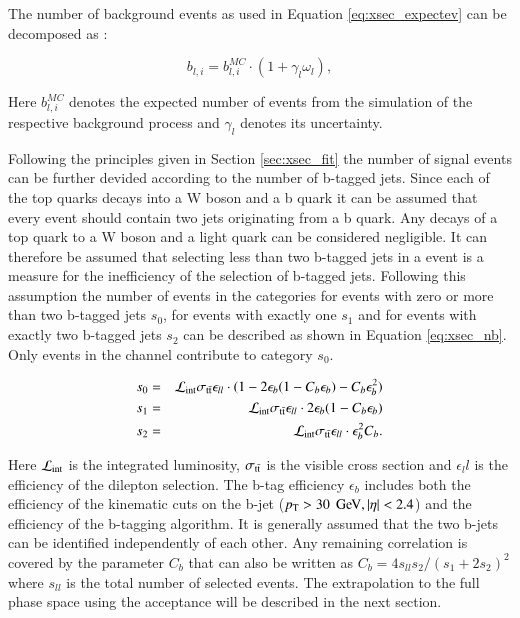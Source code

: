 The number of background events as used in Equation \ref{eq:xsec_expectev} can be decomposed as :

\begin{equation}
b_{l,i} = b_{l,i}^{MC} \cdot (1 + \gamma_l \omega_l),
\label{eq:nbli}
\end{equation}

Here $b_{l,i}^{MC}$ denotes the expected number of events from the simulation of the respective background process and $\gamma_l$ denotes its uncertainty.

Following the principles given in Section \ref{sec:xsec_fit}  the number of signal events can be further devided according to the number of b-tagged jets.
Since each of the top quarks decays into a W boson and a b quark it can be assumed that every \ttbar event should contain two jets originating from a b quark.
Any decays of a top quark to a W boson and a light quark can be considered negligible.
It can therefore be assumed that selecting less than two b-tagged jets in a \ttbar event is a measure for the inefficiency of the selection of b-tagged jets.
Following this assumption the number of events in the categories for events with zero or more than two b-tagged jets $s_0$, for events with exactly one $s_1$ and for events with exactly two b-tagged jets $s_2$ can be described as shown in Equation \ref{eq:xsec_nb}. Only events in the \emu channel contribute to category $s_0$.

\begin{eqnarray}
s_0  &=& \mathcal{L}_{\rm int}\sigma_\mathrm{t\bar{t}} \epsilon_{ll} \cdot (1-2\epsilon_b(1-C_b\epsilon_b)-C_b\epsilon_b^2) \\
s_1  &=& \mathcal{L}_{\rm int} \sigma_\mathrm{t\bar{t}} \epsilon_{ll} \cdot 2 \epsilon_b(1-C_b\epsilon_b) \\
s_2  &=& \mathcal{L}_{\rm int} \sigma_\mathrm{t\bar{t}} \epsilon_{ll} \cdot   \epsilon_b^2 C_b 
\label{eq:xsec_nb}.
\end{eqnarray}

Here $\mathcal{L}_{\rm int}$ is the integrated luminosity, $\sigma_\mathrm{t\bar{t}}$ is the visible \ttbar cross section and $\epsilon_ll$ is the efficiency of the dilepton selection.
The b-tag efficiency $\epsilon_b$ includes both the efficiency of the kinematic cuts on the b-jet ($p_{\mathrm{T}} > 30\; \,\text{Ge\hspace{-.08em}V}, |\eta|<2.4$) and the efficiency of the b-tagging algorithm.
It is generally assumed that the two b-jets can be identified independently of each other. Any remaining correlation is covered by the parameter $C_b$ that can also be written as
$C_b=4s_{ll}s_2/(s_1+2s_2)^2$ where $s_{ll}$ is the total number of selected events. 
The extrapolation to the full phase space using the acceptance will be described in the next section.

